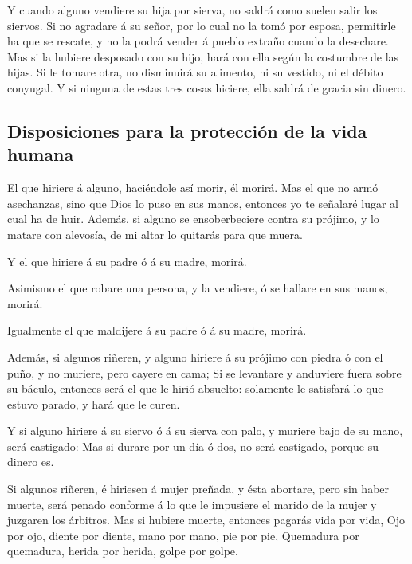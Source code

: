  Y cuando alguno vendiere su hija por sierva, no saldrá como
suelen salir los siervos.  Si no agradare á su señor, por lo
cual no la tomó por esposa, permitirle ha que se rescate, y no la podrá
vender á pueblo extraño cuando la desechare.  Mas si la
hubiere desposado con su hijo, hará con ella según la costumbre de las
hijas.  Si le tomare otra, no disminuirá su alimento, ni su
vestido, ni el débito conyugal.  Y si ninguna de estas tres
cosas hiciere, ella saldrá de gracia sin dinero.

\hypertarget{disposiciones-para-la-protecciuxf3n-de-la-vida-humana}{%
\subsection{Disposiciones para la protección de la vida
humana}\label{disposiciones-para-la-protecciuxf3n-de-la-vida-humana}}

 El que hiriere á alguno, haciéndole así morir, él morirá.
 Mas el que no armó asechanzas, sino que Dios lo puso en
sus manos, entonces yo te señalaré lugar al cual ha de huir.
 Además, si alguno se ensoberbeciere contra su prójimo, y
lo matare con alevosía, de mi altar lo quitarás para que muera.

 Y el que hiriere á su padre ó á su madre, morirá.

 Asimismo el que robare una persona, y la vendiere, ó se
hallare en sus manos, morirá.

 Igualmente el que maldijere á su padre ó á su madre,
morirá.

 Además, si algunos riñeren, y alguno hiriere á su prójimo
con piedra ó con el puño, y no muriere, pero cayere en cama;
 Si se levantare y anduviere fuera sobre su báculo,
entonces será el que le hirió absuelto: solamente le satisfará lo que
estuvo parado, y hará que le curen.

 Y si alguno hiriere á su siervo ó á su sierva con palo, y
muriere bajo de su mano, será castigado:  Mas si durare por
un día ó dos, no será castigado, porque su dinero es.

 Si algunos riñeren, é hiriesen á mujer preñada, y ésta
abortare, pero sin haber muerte, será penado conforme á lo que le
impusiere el marido de la mujer y juzgaren los árbitros. 
Mas si hubiere muerte, entonces pagarás vida por vida,  Ojo
por ojo, diente por diente, mano por mano, pie por pie, 
Quemadura por quemadura, herida por herida, golpe por golpe.

